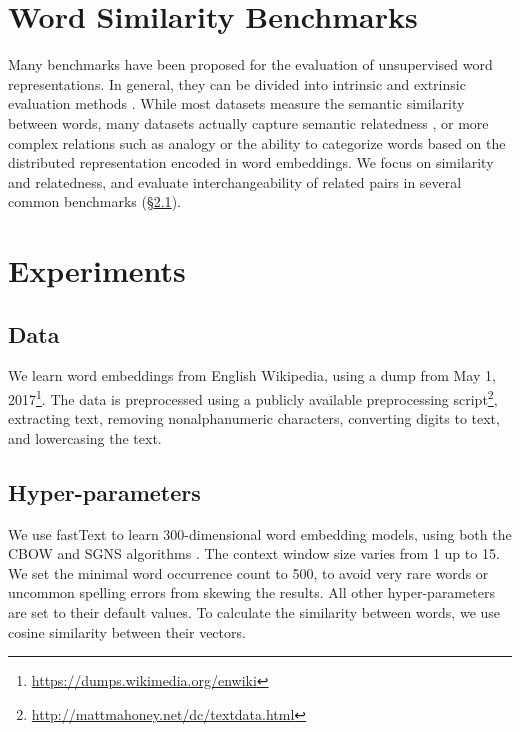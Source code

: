 \documentclass[11pt,a4paper]{article}
\begin{document}
    
    
    \section{Word Similarity Benchmarks}\label{sec:benchmarks}
    
    Many benchmarks have been proposed for the evaluation of unsupervised word
    representations.
    In general, they can be divided into intrinsic and extrinsic evaluation methods
    \cite{schnabel2015evaluation,chiu2016intrinsic,jastrzebski2017evaluate,alshargi2018concept2vec,bakarov2018survey}.
    While most datasets measure the semantic similarity between words,
    many datasets actually capture semantic relatedness
    \cite{hill2015simlex,avraham2016improving},
    or more complex relations such as analogy or the ability to categorize
    words based on the distributed representation encoded in word embeddings.
    We focus on similarity and relatedness, and evaluate interchangeability
    of related pairs in several common benchmarks (\S\ref{sec:data}).
    
    
    \section{Experiments}\label{sec:exp}
    
    \subsection{Data}\label{sec:data}
    We learn word embeddings from English Wikipedia,
    using a dump from May 1, 2017\footnote{\url{https://dumps.wikimedia.org/enwiki}}.
    The data is preprocessed using a publicly available preprocessing
    script\footnote{\url{http://mattmahoney.net/dc/textdata.html}},
    extracting text, removing nonalphanumeric characters,
    converting digits to text, and lowercasing the text.
    
    \subsection{Hyper-parameters}\label{sec:hyperparams}
    We use fastText \cite{bojanowski2016enriching} to learn
    300-dimensional word embedding models,
    using both the CBOW and SGNS algorithms \cite{mikolov2013efficient}.
    The context window size varies from 1 up to 15.
    We set the minimal word occurrence count to 500, to avoid
    very rare words or uncommon spelling errors from skewing the results.
    All other hyper-parameters are set to their default values.
    To calculate the similarity between words, we use cosine similarity
    between their vectors.
    
\end{document}
